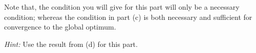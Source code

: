 \begin{enumerate}
    Note that, the condition you will give for this part will only be a necessary condition; whereas the condition in part (c) is both necessary and sufficient for convergence to the global optimum. 
    
    \emph{Hint:} Use the result from (d) for this part.
    
    \sol{}
    
    





\end{enumerate}